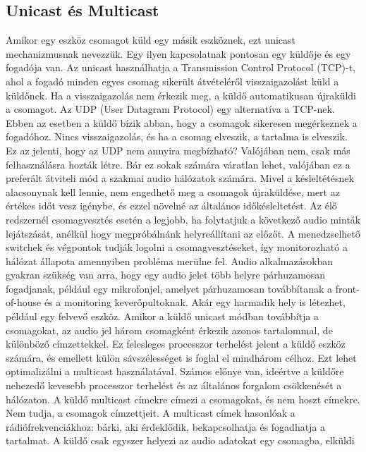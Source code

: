 \subsection{Unicast és Multicast} %
Amikor egy eszköz csomagot küld egy másik eszköznek, ezt unicast mechanizmusnak
nevezzük. Egy ilyen kapcsolatnak pontosan egy küldője és egy fogadója van. Az
unicast használhatja a Transmission Control Protocol (TCP)-t, ahol a fogadó
minden egyes csomag sikerült átvételéről visszaigazolást küld a küldőnek. Ha a
visszaigazolás nem érkezik meg, a küldő automatikusan újraküldi a csomagot. 
Az UDP (User Datagram Protocol) egy alternatíva a TCP-nek. Ebben az esetben a küldő
bízik abban, hogy a csomagok sikeresen megérkeznek a fogadóhoz. Nincs
visszaigazolás, és ha a csomag elveszik, a tartalma is elveszik.
Ez az jelenti, hogy az UDP nem annyira megbízható? Valójában nem,
csak más felhasználásra hozták létre. 
Bár ez sokak számára váratlan lehet, valójában ez a preferált átviteli mód a szakmai audio hálózatok
számára. Mivel a késleltétésnek alacsonynak kell lennie, nem engedhető meg a
csomagok újraküldése, mert az értékes időt vesz igénybe, és ezzel növelné az általános
időkésleltetést. Az élő redszernél csomagvesztés esetén a legjobb, ha folytatjuk a
következő audio minták lejátszását, anélkül hogy megpróbálnánk helyreállítani az
előzőt. A menedzselhető switchek és végpontok tudják logolni a csomagvesztéseket, így
monitorozható a hálózat állapota amennyiben probléma merülne fel.
Audio alkalmazásokban gyakran szükség van arra, hogy egy audio jelet
több helyre párhuzamosan fogadjanak, például egy mikrofonjel, amelyet
párhuzamosan továbbítanak a front-of-house és a monitoring keverőpultoknak. Akár
egy harmadik hely is létezhet, például egy felvevő eszköz. 
Amikor a küldő unicast módban továbbítja a csomagokat, az audio jel három csomagként
érkezik azonos tartalommal, de különböző címzettekkel. Ez felesleges
processzor terhelést jelent a küldő eszköz számára, és emellett külön sávszélességet is
foglal el mindhárom célhoz. Ezt lehet optimalizálni a multicast használatával. 
Számos előnye van, ideértve a küldőre nehezedő kevesebb processzor terhelést 
és az általános forgalom csökkenését a hálózaton. 
A küldő multicast címekre címezi a csomagokat, és nem hoszt címekre. Nem tudja, a csomagok címzettjeit. 
A multicast címek hasonlóak a rádiófrekvenciákhoz: bárki, aki érdeklődik, bekapcsolhatja és fogadhatja a
tartalmat. A küldő csak egyszer helyezi az audio adatokat egy csomagba, elküldi
